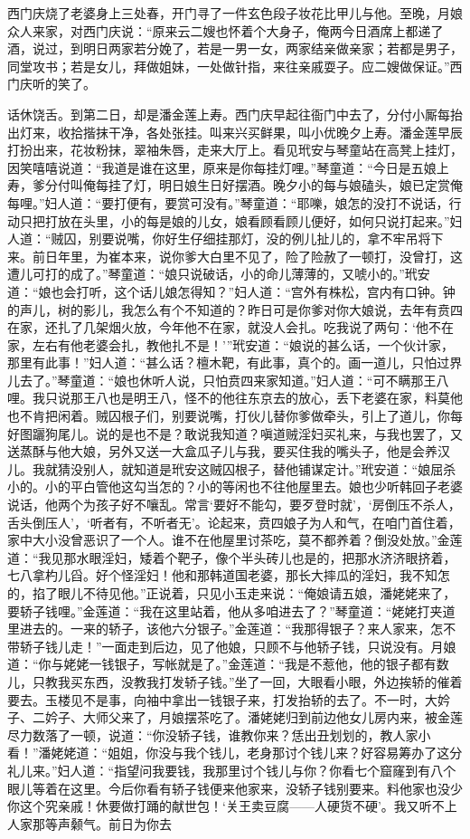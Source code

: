西门庆烧了老婆身上三处春，开门寻了一件玄色段子妆花比甲儿与他。至晚，月娘众人来家，对西门庆说：“原来云二嫂也怀着个大身子，俺两今日酒席上都递了酒，说过，到明日两家若分娩了，若是一男一女，两家结亲做亲家；若都是男子，同堂攻书；若是女儿，拜做姐妹，一处做针指，来往亲戚耍子。应二嫂做保证。”西门庆听的笑了。

话休饶舌。到第二日，却是潘金莲上寿。西门庆早起往衙门中去了，分付小厮每抬出灯来，收拾揩抹干净，各处张挂。叫来兴买鲜果，叫小优晚夕上寿。潘金莲早辰打扮出来，花妆粉抹，翠袖朱唇，走来大厅上。看见玳安与琴童站在高凳上挂灯，因笑嘻嘻说道：“我道是谁在这里，原来是你每挂灯哩。”琴童道：“今日是五娘上寿，爹分付叫俺每挂了灯，明日娘生日好摆酒。晚夕小的每与娘磕头，娘已定赏俺每哩。”妇人道：“要打便有，要赏可没有。”琴童道：“耶嚛，娘怎的没打不说话，行动只把打放在头里，小的每是娘的儿女，娘看顾看顾儿便好，如何只说打起来。”妇人道：“贼囚，别要说嘴，你好生仔细挂那灯，没的例儿扯儿的，拿不牢吊将下来。前日年里，为崔本来，说你爹大白里不见了，险了险赦了一顿打，没曾打，这遭儿可打的成了。”琴童道：“娘只说破话，小的命儿薄薄的，又唬小的。”玳安道：“娘也会打听，这个话儿娘怎得知？”妇人道：“宫外有株松，宫内有口钟。钟的声儿，树的影儿，我怎么有个不知道的？昨日可是你爹对你大娘说，去年有贲四在家，还扎了几架烟火放，今年他不在家，就没人会扎。吃我说了两句：‘他不在家，左右有他老婆会扎，教他扎不是！’”玳安道：“娘说的甚么话，一个伙计家，那里有此事！”妇人道：“甚么话？檀木靶，有此事，真个的。画一道儿，只怕过界儿去了。”琴童道：“娘也休听人说，只怕贲四来家知道。”妇人道：“可不瞒那王八哩。我只说那王八也是明王八，怪不的他往东京去的放心，丢下老婆在家，料莫他也不肯把闲着。贼囚根子们，别要说嘴，打伙儿替你爹做牵头，引上了道儿，你每好图躧狗尾儿。说的是也不是？敢说我知道？嗔道贼淫妇买礼来，与我也罢了，又送蒸酥与他大娘，另外又送一大盒瓜子儿与我，要买住我的嘴头子，他是会养汉儿。我就猜没别人，就知道是玳安这贼囚根子，替他铺谋定计。”玳安道：“娘屈杀小的。小的平白管他这勾当怎的？小的等闲也不往他屋里去。娘也少听韩回子老婆说话，他两个为孩子好不嚷乱。常言‘要好不能勾，要歹登时就’，‘房倒压不杀人，舌头倒压人’，‘听者有，不听者无’。论起来，贲四娘子为人和气，在咱门首住着，家中大小没曾恶识了一个人。谁不在他屋里讨茶吃，莫不都养着？倒没处放。”金莲道：“我见那水眼淫妇，矮着个靶子，像个半头砖儿也是的，把那水济济眼挤着，七八拿杓儿舀。好个怪淫妇！他和那韩道国老婆，那长大摔瓜的淫妇，我不知怎的，掐了眼儿不待见他。”正说着，只见小玉走来说：“俺娘请五娘，潘姥姥来了，要轿子钱哩。”金莲道：“我在这里站着，他从多咱进去了？”琴童道：“姥姥打夹道里进去的。一来的轿子，该他六分银子。”金莲道：“我那得银子？来人家来，怎不带轿子钱儿走！”一面走到后边，见了他娘，只顾不与他轿子钱，只说没有。月娘道：“你与姥姥一钱银子，写帐就是了。”金莲道：“我是不惹他，他的银子都有数儿，只教我买东西，没教我打发轿子钱。”坐了一回，大眼看小眼，外边挨轿的催着要去。玉楼见不是事，向袖中拿出一钱银子来，打发抬轿的去了。不一时，大妗子、二妗子、大师父来了，月娘摆茶吃了。潘姥姥归到前边他女儿房内来，被金莲尽力数落了一顿，说道：“你没轿子钱，谁教你来？恁出丑划划的，教人家小看！”潘姥姥道：“姐姐，你没与我个钱儿，老身那讨个钱儿来？好容易筹办了这分礼儿来。”妇人道：“指望问我要钱，我那里讨个钱儿与你？你看七个窟窿到有八个眼儿等着在这里。今后你看有轿子钱便来他家来，没轿子钱别要来。料他家也没少你这个究亲戚！休要做打踊的献世包！‘关王卖豆腐——人硬货不硬’。我又听不上人家那等声颡气。前日为你去